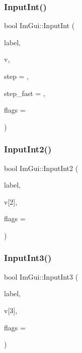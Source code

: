 \mbox{\label{namespaceImGui_a36fc45a3c41a63ea9a983cc851752505}} 
\subsubsection{\texorpdfstring{Input\+Int()}{InputInt()}}
{\footnotesize\ttfamily bool Im\+Gui\+::\+Input\+Int (\begin{DoxyParamCaption}\item[{const char $\ast$}]{label,  }\item[{int $\ast$}]{v,  }\item[{int}]{step = {},  }\item[{int}]{step\+\_\+fast = {},  }\item[{Im\+Gui\+Input\+Text\+Flags}]{flags = {} }\end{DoxyParamCaption})}

\mbox{\label{namespaceImGui_a83dfd2daacefb741e67d8d69821e1590}} 
\subsubsection{\texorpdfstring{Input\+Int2()}{InputInt2()}}
{\footnotesize\ttfamily bool Im\+Gui\+::\+Input\+Int2 (\begin{DoxyParamCaption}\item[{const char $\ast$}]{label,  }\item[{int}]{v\mbox{[}2\mbox{]},  }\item[{Im\+Gui\+Input\+Text\+Flags}]{flags = {} }\end{DoxyParamCaption})}

\mbox{\label{namespaceImGui_ab8e7466e5bdda70fefa551eb662dc3f5}} 
\subsubsection{\texorpdfstring{Input\+Int3()}{InputInt3()}}
{\footnotesize\ttfamily bool Im\+Gui\+::\+Input\+Int3 (\begin{DoxyParamCaption}\item[{const char $\ast$}]{label,  }\item[{int}]{v\mbox{[}3\mbox{]},  }\item[{Im\+Gui\+Input\+Text\+Flags}]{flags = {} }\end{DoxyParamCaption})}


